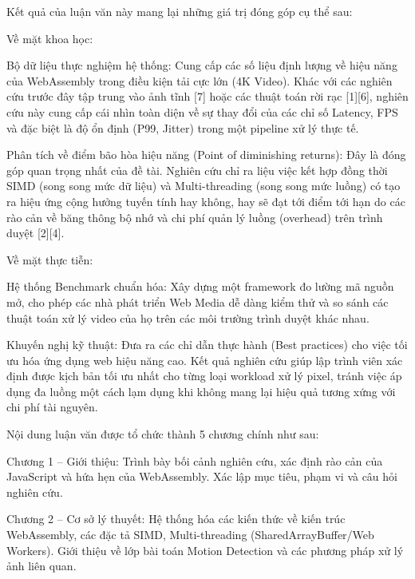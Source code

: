 

Kết quả của luận văn này mang lại những giá trị đóng góp cụ thể sau:


Về mặt khoa học:


Bộ dữ liệu thực nghiệm hệ thống: Cung cấp các số liệu định lượng về hiệu năng của WebAssembly trong điều kiện tải cực lớn (4K Video). Khác với các nghiên cứu trước đây tập trung vào ảnh tĩnh [7] hoặc các thuật toán rời rạc [1][6], nghiên cứu này cung cấp cái nhìn toàn diện về sự thay đổi của các chỉ số Latency, FPS và đặc biệt là độ ổn định (P99, Jitter) trong một pipeline xử lý thực tế.


Phân tích về điểm bão hòa hiệu năng (Point of diminishing returns): Đây là đóng góp quan trọng nhất của đề tài. Nghiên cứu chỉ ra liệu việc kết hợp đồng thời SIMD (song song mức dữ liệu) và Multi-threading (song song mức luồng) có tạo ra hiệu ứng cộng hưởng tuyến tính hay không, hay sẽ đạt tới điểm tới hạn do các rào cản về băng thông bộ nhớ và chi phí quản lý luồng (overhead) trên trình duyệt [2][4].


Về mặt thực tiễn:


Hệ thống Benchmark chuẩn hóa: Xây dựng một framework đo lường mã nguồn mở, cho phép các nhà phát triển Web Media dễ dàng kiểm thử và so sánh các thuật toán xử lý video của họ trên các môi trường trình duyệt khác nhau.


Khuyến nghị kỹ thuật: Đưa ra các chỉ dẫn thực hành (Best practices) cho việc tối ưu hóa ứng dụng web hiệu năng cao. Kết quả nghiên cứu giúp lập trình viên xác định được kịch bản tối ưu nhất cho từng loại workload xử lý pixel, tránh việc áp dụng đa luồng một cách lạm dụng khi không mang lại hiệu quả tương xứng với chi phí tài nguyên.



Nội dung luận văn được tổ chức thành 5 chương chính như sau:


Chương 1 – Giới thiệu: Trình bày bối cảnh nghiên cứu, xác định rào cản của JavaScript và hứa hẹn của WebAssembly. Xác lập mục tiêu, phạm vi và câu hỏi nghiên cứu.


Chương 2 – Cơ sở lý thuyết: Hệ thống hóa các kiến thức về kiến trúc WebAssembly, các đặc tả SIMD, Multi-threading (SharedArrayBuffer/Web Workers). Giới thiệu về lớp bài toán Motion Detection và các phương pháp xử lý ảnh liên quan.


